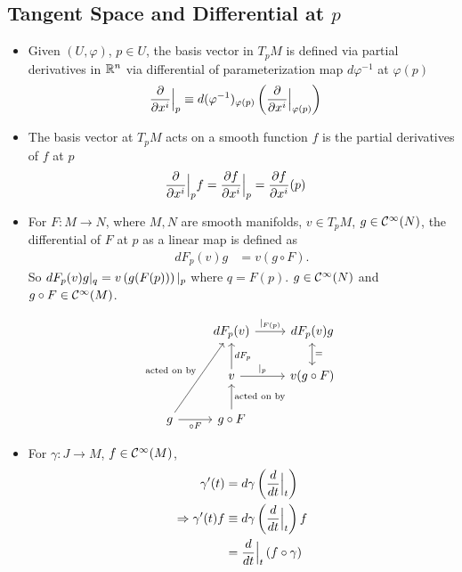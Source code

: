 \documentclass[11pt]{article}
\begin{document}
\subsection{Tangent Space and Differential at $p$}
\begin{itemize}
\item Given $(U, \varphi)$, $p \in U$, the basis vector in  $T_pM$ is defined via partial derivatives in ${\mathbb R}^{n}$ via differential of parameterization map $d\varphi^{-1}$ at $\varphi(p)$
\begin{align}
\frac{\partial }{ \partial x^i}\Bigr|_{p} &\equiv d(\varphi^{-1})_{\varphi(p)}\left( \frac{\partial }{ \partial x^i}\Bigr|_{\varphi(p)}\right) \label{eqn: basis_tangent_at_p_def}
\end{align}

\item The basis vector at $T_pM$ acts on a smooth function $f$ is the partial derivatives of $f$ at $p$
\begin{align*}
\frac{\partial }{ \partial x^i}\Bigr|_{p} f &= \frac{\partial f}{ \partial x^i}\Bigr|_{p} =  \frac{\partial f}{ \partial x^i}(p)
\end{align*}

\item For $F: M \rightarrow N$, where $M, N$ are smooth manifolds, $v \in T_pM$, $g \in {\mathcal C}^{\infty}(N)$, the differential of $F$ at $p$ as a linear map is defined as 
\begin{align}
dF_p(v)g &= v(g \circ F).  \label{eqn: differential_at_p_def}
\end{align} So $dF_p(v)g|_q = v\left(g(F(p))\right)|_{p}$ where $q = F(p)$. $g \in {\mathcal C}^{\infty}(N)$ and $g \circ F \in {\mathcal C}^{\infty}(M)$.

\begin{remark}
\[
  \begin{tikzcd}
     & dF_p(v) \arrow{r}{|_{F(p)}}    &dF_p(v)g  \arrow[d, leftrightarrow,  "="] \\
     & v \arrow[swap]{u}{dF_p}  \arrow{r}{|_{p}} &  v( g \circ F) \\
     g \arrow[swap]{r}{\circ F} \arrow{uur}{\text{acted on by}}& g\circ F \arrow[swap]{u}{\text{acted on by}} & 
  \end{tikzcd}
\] 
\end{remark}

\item For $\gamma: J \rightarrow M$, $f \in {\mathcal C}^{\infty}(M)$, 
\begin{align}
\gamma'(t) &= d\gamma\left(\frac{d}{dt}\Bigr|_{t}\right) \label{eqn: curve_velocity_def} \\
\Rightarrow \gamma'(t)f &\equiv d\gamma\left(\frac{d}{dt}\Bigr|_{t}\right)f \nonumber \\
&= \frac{d}{dt}\Bigr|_{t}\left(f \circ \gamma\right) \label{eqn: curve_velocity_on_f}
\end{align}


\end{itemize}
\end{document}
